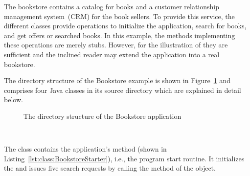 \pagebreak

The bookstore contains a catalog for books and a customer relationship management system~(CRM) for the book sellers. To provide this service, the different classes provide operations to initialize the application, search for books, and get offers or searched books. In this example, the methods implementing these operations are merely stubs. However, for the illustration of \Kieker{} they are sufficient and the inclined reader may extend the application into a real bookstore.

The directory structure of the Bookstore example is shown in Figure~\ref{fig:PlainBookstoreExample} and comprises four Java classes in its source directory  which are explained in detail below.

\begin{figure}[H]
\begin{graybox}
\end{graybox}

\caption{The directory structure of the Bookstore application}
\label{fig:PlainBookstoreExample}
\end{figure}


\quad\

\enlargethispage{1cm}

\noindent The class  contains the application's  method (shown in Listing~\ref{lst:class:BookstoreStarter}), i.e., the program start routine. It initializes the  and issues five search requests by calling the  method of the  object.

\medskip

\setJavaCodeListing


